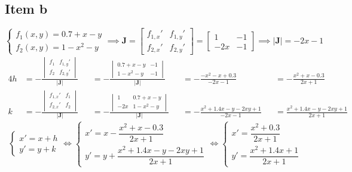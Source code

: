 \subsection{Item b}
\begin{equation*}
	\begin{cases}
		f_1(x,y)=0.7+x-y\\
		f_2(x,y)=1-x^2-y
	\end{cases}
	\implies
	\mathbf{J}=\begin{bmatrix}
  		f_{1,x}' & f_{1,y}'\\
  		f_{2,x}' & f_{2,y}'
	\end{bmatrix}=\begin{bmatrix}
  		1   & -1\\
  		-2x & -1
	\end{bmatrix}
	\implies
	|\mathbf{J}|=-2x-1
\end{equation*}
\begin{alignat*}{4}
	h&=-\frac{
		\begin{vmatrix}
			f_1 & f_{1,y}' \\
			f_2 & f_{2,y}'
		\end{vmatrix}}
		{|\mathbf{J}|}
	   &&=-\frac{
		\begin{vmatrix}
			0.7+x-y & -1 \\
			1-x^2-y & -1
		\end{vmatrix}}
		{|\mathbf{J}|}
	   &&=-\frac{-x^2-x+0.3}{-2x-1}
	   &&=-\frac{x^2+x-0.3}{2x+1} \\
	k&=-\frac{
		\begin{vmatrix}
			f_{1,x}' & f_1 \\
			f_{2,x}' & f_2
		\end{vmatrix}}
		{|\mathbf{J}|}
	   &&=-\frac{
		\begin{vmatrix}
			 1  & 0.7+x-y \\
			-2x & 1-x^2-y
		\end{vmatrix}}
		{|\mathbf{J}|}
	   &&=-\frac{x^2+1.4x-y-2x y+1}{-2x-1}
	   &&=\frac{x^2+1.4x-y-2x y+1}{2x+1}
\end{alignat*}
\begin{equation*}
	\begin{cases}
		x'=x+h\\
		y'=y+k
	\end{cases}
	\iff
	\begin{cases}
		x'=x-\dfrac{x^2+x-0.3}{2x+1}\\[1em]
		y'=y+\dfrac{x^2+1.4x-y-2x y+1}{2x+1}
	\end{cases}
	\iff
	\begin{cases}
		x'=\dfrac{x^2+0.3}{2x+1}\\[1em]
		y'=\dfrac{x^2+1.4x+1}{2x+1}
	\end{cases}
\end{equation*}
